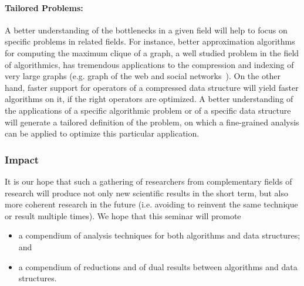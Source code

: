 \documentclass[a4paper,10pt]{article}
\begin{document}
\paragraph{Tailored Problems:}

A better understanding of the bottlenecks in a given field will help to focus on specific problems in related fields.
%
For instance, better approximation algorithms for computing the maximum clique of a graph, a well studied problem in the field of algorithmics, has tremendous applications to the compression and indexing of very large graphs (e.g. graph of the web and social networks~\cite{HNkais13}).
On the other hand, faster support for operators of a compressed data structure will yield faster algorithms on it, if the right operators are optimized.
%
A better understanding of the applications of a specific algorithmic problem or of a specific data structure will generate a tailored definition of the problem, on which a fine-grained analysis can be applied to optimize this particular application.




\subsubsection{Impact}
\label{sec:impact}

It is our hope that such a gathering of researchers from complementary fields of research will produce not only new scientific results in the short term, but also more coherent research in the future (i.e. avoiding to reinvent the same technique or result multiple times). We hope that this seminar will promote
\begin{itemize}
\item a compendium of  analysis techniques for both algorithms and data structures;  and
\item a compendium of reductions and of dual results between algorithms and data structures.
\end{itemize}
\end{document}
